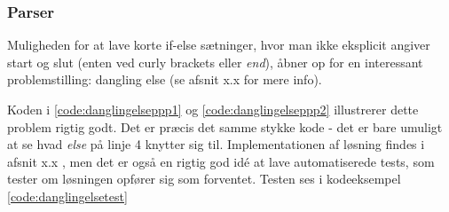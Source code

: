 \subsubsection{Parser}

Muligheden for at lave korte if-else sætninger, hvor man ikke eksplicit angiver start og slut (enten ved curly brackets  eller \textit{end}), åbner op for en interessant problemstilling: dangling else (se afsnit x.x for mere info). 



\noindent Koden i \ref{code:danglingelseppp1} og \ref{code:danglingelseppp2} illustrerer dette problem rigtig godt. Det er præcis det samme stykke kode - det er bare umuligt at se hvad \textit{else} på linje 4 knytter sig til. Implementationen af løsning findes i afsnit x.x , men det er også en rigtig god idé at lave automatiserede tests, som tester om løsningen opfører sig som forventet. Testen ses i kodeeksempel \ref{code:danglingelsetest}


